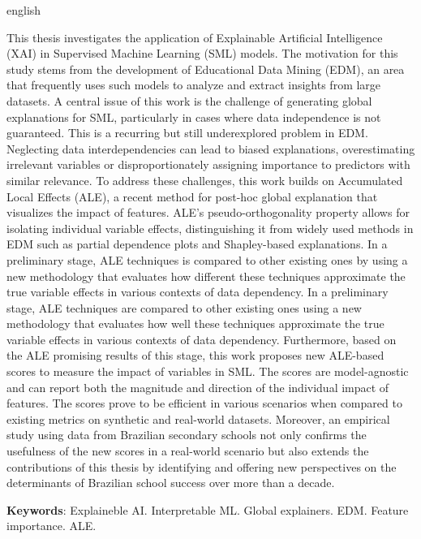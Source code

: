 \begin{resumo}[Abstract]
\begin{otherlanguage*}{english}

This thesis investigates the application of Explainable Artificial Intelligence (XAI) in Supervised Machine Learning (SML) models. The motivation for this study stems from the development of Educational Data Mining (EDM), an area that frequently uses such models to analyze and extract insights from large datasets. A central issue of this work is the challenge of generating global explanations for SML, particularly in cases where data independence is not guaranteed. This is a recurring but still underexplored problem in EDM. Neglecting data interdependencies can lead to biased explanations, overestimating irrelevant variables or disproportionately assigning importance to predictors with similar relevance. To address these challenges, this work builds on Accumulated Local Effects (ALE), a recent method for post-hoc global explanation that visualizes the impact of features. ALE’s pseudo-orthogonality property allows for isolating individual variable effects, distinguishing it from widely used methods in EDM such as partial dependence plots and Shapley-based explanations. In a preliminary stage, ALE techniques is compared to other existing ones by using a new methodology that evaluates how different these techniques approximate the true variable effects in various contexts of data dependency. In a preliminary stage, ALE techniques are compared to other existing ones using a new methodology that evaluates how well these techniques approximate the true variable effects in various contexts of data dependency. Furthermore, based on the ALE promising results of this stage, this work proposes new ALE-based scores to measure the impact of variables in SML. The scores are model-agnostic and can report both the magnitude and direction of the individual impact of features. The scores prove to be efficient in various scenarios when compared to existing metrics on synthetic and real-world datasets. Moreover, an empirical study using data from Brazilian secondary schools not only confirms the usefulness of the new scores in a real-world scenario but also extends the contributions of this thesis by identifying and offering new perspectives on the determinants of Brazilian school success over more than a decade.

\vspace{\onelineskip} 

\noindent 
\textbf{Keywords}: Explaineble AI. Interpretable ML.  Global explainers. EDM. Feature importance. ALE.
\end{otherlanguage*}
\end{resumo}
